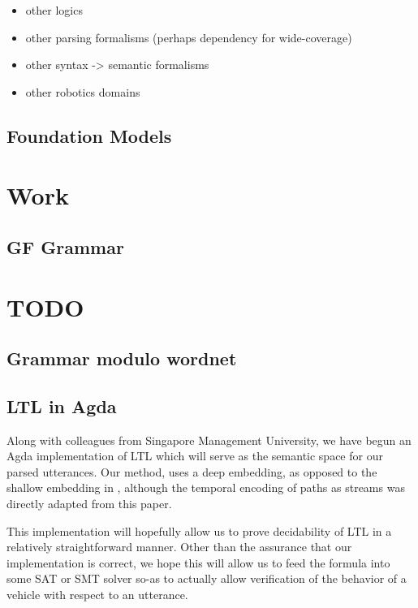 \documentclass[a4paper, 11pt]{article}
\begin{document}
\begin{itemize}
\item other logics
\item other parsing formalisms (perhaps dependency for wide-coverage)
\item other syntax -> semantic formalisms
\item other robotics domains
\end{itemize}


\subsection{Foundation Models}

\section{Work} 

\subsection{GF Grammar}

\section{TODO} 

\subsection{Grammar modulo wordnet}

\subsection{LTL in Agda}

Along with colleagues from Singapore Management University, we have begun an
Agda implementation \cite{wltl} of LTL which will serve as the semantic space
for our parsed utterances. Our method, uses a deep embedding, as opposed to the
shallow embedding in \cite{coqLTL}, although the temporal encoding of paths as
streams was directly adapted from this paper.

This implementation will hopefully allow us to prove decidability of LTL in a
relatively straightforward manner. Other than the assurance that our
implementation is correct, we hope this will allow us to feed the formula into
some SAT or SMT solver so-as to actually allow verification of the behavior of a
vehicle with respect to an utterance.
\end{document}
